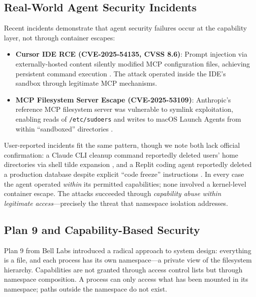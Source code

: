 \documentclass{article}
\begin{document}
\subsection{Real-World Agent Security Incidents}

Recent incidents demonstrate that agent security failures occur at the capability layer, not through container escapes:

\begin{itemize}
    \item \textbf{Cursor IDE RCE (CVE-2025-54135, CVSS 8.6)}: Prompt injection via externally-hosted content silently modified MCP configuration files, achieving persistent command execution \cite{cursor2025rce}. The attack operated inside the IDE's sandbox through legitimate MCP mechanisms.

    \item \textbf{MCP Filesystem Server Escape (CVE-2025-53109)}: Anthropic's reference MCP filesystem server was vulnerable to symlink exploitation, enabling reads of \texttt{/etc/sudoers} and writes to macOS Launch Agents from within ``sandboxed'' directories \cite{nvdCVE202553109}.
\end{itemize}

User-reported incidents fit the same pattern, though we note both lack official confirmation: a Claude CLI cleanup command reportedly deleted users' home directories via shell tilde expansion \cite{claudecli2024incident}, and a Replit coding agent reportedly deleted a production database despite explicit ``code freeze'' instructions \cite{replit2025incident}. In every case the agent operated \textit{within} its permitted capabilities; none involved a kernel-level container escape. The attacks succeeded through \textit{capability abuse within legitimate access}---precisely the threat that namespace isolation addresses.

\subsection{Plan 9 and Capability-Based Security}

Plan 9 from Bell Labs \cite{pike1990plan9} introduced a radical approach to system design: everything is a file, and each process has its own namespace---a private view of the filesystem hierarchy. Capabilities are not granted through access control lists but through namespace composition. A process can only access what has been mounted in its namespace; paths outside the namespace do not exist.
\end{document}
